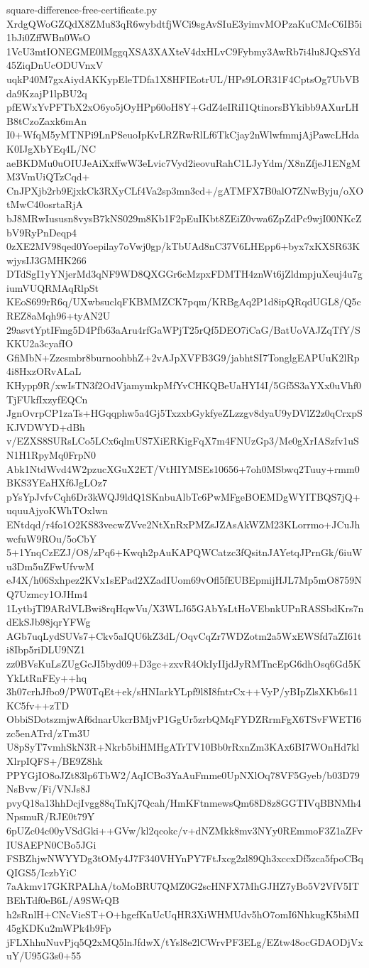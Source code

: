 \documentclass[11pt]{article}
\theoremstyle{definition}
\theoremstyle{remark}
\begin{document}
\begin{filecontents*}[overwrite]{square-difference-free-certificate.py}
XrdgQWoGZQdX8ZMu83qR6wybdtfjWCi9sgAvSIuE3yimvMOPzaKuCMcC6IB5i1bJi0ZffWBn0WsO
1VcU3mtIONEGME0lMggqXSA3XAXteV4dxHLvC9Fybmy3AwRb7i4lu8JQxSYd45ZiqDnUcODUVnxV
uqkP40M7gxAiydAKKypEleTDfa1X8HFIEotrUL/HPs9LOR31F4CptsOg7UbVBda9KzajP1lpBU2q
pfEWxYvPFTbX2xO6yo5jOyHPp60oH8Y+GdZ4eIRiI1QtinorsBYkibb9AXurLHB8tCzoZaxk6mAn
I0+WfqM5yMTNPi9LnPSeuoIpKvLRZRwRlLf6TkCjay2nWlwfmmjAjPawcLHdaK0IJgXbYEq4L/NC
aeBKDMu0uOIUJeAiXxffwW3eLvic7Vyd2ieovuRahC1LJyYdm/X8nZfjeJ1ENgMM3VmUiQTzCqd+
CnJPXjb2rb9EjxkCk3RXyCLf4Va2sp3mn3cd+/gATMFX7B0alO7ZNwByju/oXOtMwC40osrtaRjA
bJ8MRwIususn8vysB7kNS029m8Kb1F2pEuIKbt8ZEiZ0vwa6ZpZdPc9wjI00NKcZbV9RyPnDeqp4
0zXE2MV98qed0Yoepilay7oVwj0gp/kTbUAd8nC37V6LHEpp6+byx7xKXSR63KwjysIJ3GMHK266
DTdSgI1yYNjerMd3qNF9WD8QXGGr6cMzpxFDMTH4znWt6jZldmpjuXeuj4u7giumVUQRMAqRlpSt
KEoS699rR6q/UXwbsuclqFKBMMZCK7pqm/KRBgAq2P1d8ipQRqdUGL8/Q5cREZ8aMqh96+tyAN2U
29asvtYptIFmg5D4Pfb63aAru4rfGaWPjT25rQf5DEO7iCaG/BatUoVAJZqTfY/SKKU2a3cyafIO
GfiMbN+Zzcsmbr8burnoohbhZ+2vAJpXVFB3G9/jabhtSI7TonglgEAPUuK2lRp4i8HxzORvALaL
KHypp9R/xwIsTN3f2OdVjamymkpMfYvCHKQBeUaHYI4I/5Gf5S3aYXx0uVhf0TjFUkfIxzyfEQCn
JgnOvrpCP1zaTs+HGqqphw5a4Gj5TxzxbGykfyeZLzzgv8dyaU9yDVlZ2z0qCrxpSKJVDWYD+dBh
v/EZXS8SURsLCo5LCx6qlmUS7XiERKigFqX7m4FNUzGp3/Me0gXrIASzfv1uSN1H1RpyMq0FrpN0
Abk1NtdWvd4W2pzucXGuX2ET/VtHIYMSEs10656+7oh0MSbwq2Tuuy+rmm0BKS3YEaHXf6JgLOz7
pYsYpJvfvCqh6Dr3kWQJ9ldQ1SKnbuAlbTc6PwMFgeBOEMDgWYITBQS7jQ+uquuAjyoKWhTOxlwn
ENtdqd/r4fo1O2KS83vecwZVve2NtXnRxPMZsJZAsAkWZM23KLorrmo+JCuJhwcfuW9ROu/5oCbY
5+1YnqCzEZJ/O8/zPq6+Kwqh2pAuKAPQWCatzc3fQsitnJAYetqJPrnGk/6iuWu3Dm5uZFwUfvwM
eJ4X/h06Sxhpez2KVx1sEPad2XZadIUom69vOfl5fEUBEpmijHJL7Mp5mO8759NQ7Uzmcy1OJHm4
1LytbjTl9ARdVLBwi8rqHqwVu/X3WLJ65GAbYsLtHoVEbnkUPnRASSbdKrs7ndEkSJb98jqrYFWg
AGb7uqLydSUVs7+Ckv5aIQU6kZ3dL/OqvCqZr7WDZotm2a5WxEWSfd7aZI61ti8Ibp5riDLU9NZ1
zz0BVsKuLsZUgGcJI5byd09+D3gc+zxvR4OkIyIIjdJyRMTncEpG6dhOsq6Gd5KYkLtRnFEy++hq
3h07crhJfbo9/PW0TqEt+ek/sHNIarkYLpf9l8I8fntrCx++VyP/yBIpZlsXKb6s11KC5fv++zTD
ObbiSDotszmjwAf6dnarUkcrBMjvP1GgUr5zrbQMqFYDZRrmFgX6TSvFWETI6zc5enATrd/zTm3U
U8pSyT7vmhSkN3R+Nkrb5biHMHgATrTV10Bb0rRxnZm3KAx6BI7WOnHd7klXlrpIQFS+/BE9Z8hk
PPYGjIO8oJZt83lp6TbW2/AqICBo3YaAuFmme0UpNXlOq78VF5Gyeb/b03D79NsBvw/Fi/VNJs8J
pvyQ18a13hhDcjIvgg88qTnKj7Qcah/HmKFtnmewsQm68D8z8GGTIVqBBNMh4NpsmuR/RJE0t79Y
6pUZc04c00yVSdGki++GVw/kl2qcokc/v+dNZMkk8mv3NYy0REmmoF3Z1aZFvIUSAEPN0CBo5JGi
FSBZhjwNWYYDg3tOMy4J7F340VHYnPY7FtJxcg2zl89Qh3xccxDf5zca5fpoCBqQIGS5/IczbYiC
7aAkmv17GKRPALhA/toMoBRU7QMZ0G2scHNFX7MhGJHZ7yBo5V2VfV5ITBEhTdf0eB6L/A9SWrQB
h2sRnlH+CNcVieST+O+hgefKnUcUqHR3XiWHMUdv5hO7omI6NhkugK5biMI45gKDKu2mWPk4b9Fp
jFLXhhuNuvPjq5Q2xMQ5lnJfdwX/tYsl8e2lCWrvPF3ELg/EZtw48ocGDAODjVxuY/U95G3s0+55

\end{filecontents*}
\end{document}
